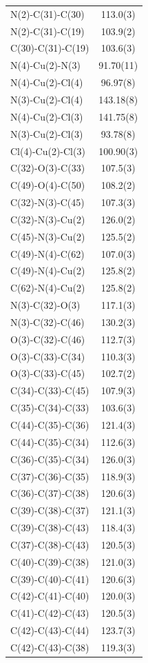 \begin{center}
{\begin{supertabular}{p{1.5in}c}
N(2)-C(31)-C(30)&113.0(3)\\
N(2)-C(31)-C(19)&103.9(2)\\
C(30)-C(31)-C(19)&103.6(3)\\
N(4)-Cu(2)-N(3)&91.70(11)\\
N(4)-Cu(2)-Cl(4)&96.97(8)\\
N(3)-Cu(2)-Cl(4)&143.18(8)\\
N(4)-Cu(2)-Cl(3)&141.75(8)\\
N(3)-Cu(2)-Cl(3)&93.78(8)\\
Cl(4)-Cu(2)-Cl(3)&100.90(3)\\
C(32)-O(3)-C(33)&107.5(3)\\
C(49)-O(4)-C(50)&108.2(2)\\
C(32)-N(3)-C(45)&107.3(3)\\
C(32)-N(3)-Cu(2)&126.0(2)\\
C(45)-N(3)-Cu(2)&125.5(2)\\
C(49)-N(4)-C(62)&107.0(3)\\
C(49)-N(4)-Cu(2)&125.8(2)\\
C(62)-N(4)-Cu(2)&125.8(2)\\
N(3)-C(32)-O(3)&117.1(3)\\
N(3)-C(32)-C(46)&130.2(3)\\
O(3)-C(32)-C(46)&112.7(3)\\
O(3)-C(33)-C(34)&110.3(3)\\
O(3)-C(33)-C(45)&102.7(2)\\
C(34)-C(33)-C(45)&107.9(3)\\
C(35)-C(34)-C(33)&103.6(3)\\
C(44)-C(35)-C(36)&121.4(3)\\
C(44)-C(35)-C(34)&112.6(3)\\
C(36)-C(35)-C(34)&126.0(3)\\
C(37)-C(36)-C(35)&118.9(3)\\
C(36)-C(37)-C(38)&120.6(3)\\
C(39)-C(38)-C(37)&121.1(3)\\
C(39)-C(38)-C(43)&118.4(3)\\
C(37)-C(38)-C(43)&120.5(3)\\
C(40)-C(39)-C(38)&121.0(3)\\
C(39)-C(40)-C(41)&120.6(3)\\
C(42)-C(41)-C(40)&120.0(3)\\
C(41)-C(42)-C(43)&120.5(3)\\
C(42)-C(43)-C(44)&123.7(3)\\
C(42)-C(43)-C(38)&119.3(3)\\

\end{supertabular}}
\end{center}

